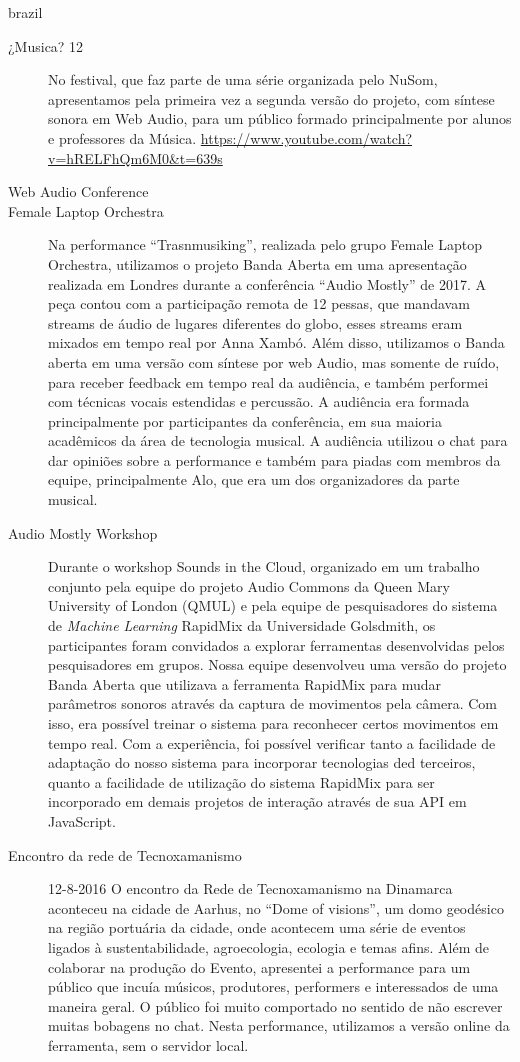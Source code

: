\begin{otherlanguage*}{brazil}
\begin{description}
\item[¿Musica? 12]
No festival, que faz parte de uma série organizada pelo NuSom, apresentamos pela primeira vez a segunda versão do projeto, com síntese sonora em Web Audio, para um público formado principalmente por alunos e professores da Música. 
\url{https://www.youtube.com/watch?v=hRELFhQm6M0&t=639s}


\item[Web Audio Conference] 


\item[Female Laptop Orchestra]
Na performance ``Trasnmusiking'', realizada pelo grupo Female Laptop Orchestra, utilizamos o projeto Banda Aberta em uma apresentação realizada em Londres durante a conferência ``Audio Mostly'' de 2017. A peça contou com a participação remota de 12 pessas, que mandavam streams de áudio de lugares diferentes do globo, esses streams eram mixados em tempo real por Anna Xambó. Além disso, utilizamos o Banda aberta em uma versão com síntese por web Audio, mas somente de ruído, para receber feedback em tempo real da audiência, e também performei com técnicas vocais estendidas e percussão. A audiência era formada principalmente por participantes da conferência, em sua maioria acadêmicos da área de tecnologia musical. A audiência utilizou o chat para dar opiniões sobre a performance e também para piadas com membros da equipe, principalmente Alo, que era um dos organizadores da parte musical.


\item[Audio Mostly Workshop]
Durante o workshop Sounds in the Cloud, organizado em um trabalho conjunto pela equipe do projeto Audio Commons da Queen Mary University of London (QMUL) e pela equipe de pesquisadores do sistema de \emph{Machine Learning} RapidMix da Universidade Golsdmith, os participantes foram convidados a explorar ferramentas desenvolvidas pelos pesquisadores em grupos. Nossa equipe desenvolveu uma versão do projeto Banda Aberta que utilizava a ferramenta RapidMix para mudar parâmetros sonoros através da captura de movimentos pela câmera. Com isso, era possível treinar o sistema para reconhecer certos movimentos em tempo real. Com a experiência, foi possível verificar tanto a facilidade de adaptação do nosso sistema para incorporar tecnologias ded terceiros, quanto a facilidade de utilização do sistema RapidMix para ser incorporado em demais projetos de interação através de sua API em JavaScript.

\item[Encontro da rede de Tecnoxamanismo] 12-8-2016
O encontro da Rede de Tecnoxamanismo na Dinamarca aconteceu na cidade de Aarhus, no ``Dome of visions'', um domo geodésico na região portuária da cidade, onde acontecem uma série de eventos ligados à sustentabilidade, agroecologia, ecologia e temas afins. Além de colaborar na produção do Evento, apresentei a performance para um público que incuía músicos, produtores, performers e interessados de uma maneira geral. O público foi muito comportado no sentido de não escrever muitas bobagens no chat. Nesta performance, utilizamos a versão online da ferramenta, sem o servidor local.



\end{description}
\end{otherlanguage*}
